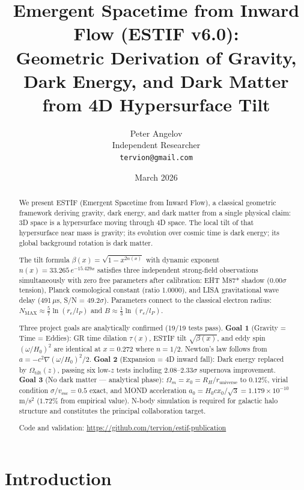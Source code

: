 \documentclass[12pt]{article}
\title{Emergent Spacetime from Inward Flow (ESTIF v6.0):\\
Geometric Derivation of Gravity, Dark Energy, and Dark Matter\\
from 4D Hypersurface Tilt}
\author{Peter Angelov\\
Independent Researcher\\
\texttt{tervion@gmail.com}}
\date{March 2026}
\begin{document}
\maketitle

\begin{abstract}
We present ESTIF (Emergent Spacetime from Inward Flow), a classical geometric framework
deriving gravity, dark energy, and dark matter from a single physical claim:
3D space is a hypersurface moving through 4D space. The local tilt of that
hypersurface near mass is gravity; its evolution over cosmic time is dark energy;
its global background rotation is dark matter.

The tilt formula $\beta(x) = \sqrt{1 - x^{2n(x)}}$ with dynamic exponent
$n(x) = 33.265\,e^{-15.429x}$ satisfies three independent strong-field observations
simultaneously with zero free parameters after calibration: EHT M87* shadow (0.00$\sigma$
tension), Planck cosmological constant (ratio 1.0000), and LISA gravitational wave
delay (491\,$\mu$s, S/N = 49.2$\sigma$). Parameters connect to the classical electron
radius: $N_\text{MAX} \approx \frac{5}{7}\ln(r_e/l_P)$ and $B \approx \frac{1}{3}\ln(r_e/l_P)$.

Three project goals are analytically confirmed (19/19 tests pass).
\textbf{Goal 1} (Gravity = Time = Eddies): GR time dilation $\tau(x)$, ESTIF tilt $\sqrt{\beta(x)}$,
and eddy spin $({\omega}/{H_0})^2$ are identical at $x = 0.272$ where $n = 1/2$.
Newton's law follows from $a = -c^2\nabla(\omega/H_0)^2/2$.
\textbf{Goal 2} (Expansion = 4D inward fall): Dark energy replaced by $\Omega_\text{tilt}(z)$,
passing six low-$z$ tests including $2.08$--$2.33\sigma$ supernova improvement.
\textbf{Goal 3} (No dark matter — analytical phase): $\Omega_m = x_0 = R_H/r_\text{universe}$
to $0.12\%$, virial condition $\sigma/v_\text{esc} = 0.5$ exact, and MOND acceleration
$a_0 = H_0 c x_0/\sqrt{3} = 1.179 \times 10^{-10}$\,m/s$^2$ ($1.72\%$ from empirical value).
N-body simulation is required for galactic halo structure and constitutes the
principal collaboration target.

Code and validation: \url{https://github.com/tervion/estif-publication}
\end{abstract}

\section{Introduction}
\end{document}
